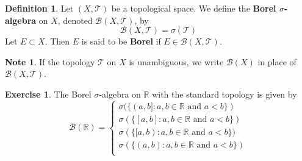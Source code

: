 \documentclass{book}
\theoremstyle{definition}
\newtheorem{defn}[definition]{Definition}
\newtheorem{note}[definition]{Note}
\newtheorem{ex}[definition]{Exercise}
\newcommand{\sig}{\sigma}
\newcommand{\R}{\mathbb{R}}
\newcommand{\MB}{\mathcal{B}}
\newcommand{\MT}{\mathcal{T}}
\newcommand{\lex}[1]{\label{ex:#1}}
\newcommand{\ld}[1]{\label{defn:#1}}
\DeclareMathOperator*{\0}{\mbf{0}}
\DeclareMathOperator*{\1}{\mbf{1}}
\begin{document}
	\begin{defn} \ld{00000} 
		Let $(X,\MT)$ be a topological space. We define the \textbf{Borel $\sig$-algebra} on $X$, denoted $\MB(X, \MT)$, by 
		$$\MB(X, \MT) = \sig(\MT)$$  
		Let $E \subset X$. Then $E$ is said to be \textbf{Borel} if $E \in \MB(X, \MT)$.
	\end{defn}

	\begin{note}
		If the topology $\MT$ on $X$ is unambiguous, we write $\MB(X)$ in place of $\MB(X, \MT)$.
	\end{note}
	
	\begin{ex} \lex{00000} 
		The Borel $\sigma$-algebra on $\R$ with the standard topology is given by 
		\[
		\MB(\R) =
		\begin{cases}
			\sig(\{(a,b]:a,b \in \R \text{ and } a<b\}) \\
			\sig(\{[a,b]:a,b \in \R \text{ and } a<b\}) \\
			\sig(\{[a,b):a,b \in \R \text{ and } a<b\}) \\
			\sig(\{(a,b):a,b \in \R \text{ and } a<b\}) \\
		\end{cases}
		\]
	\end{ex}
	
\end{document}
